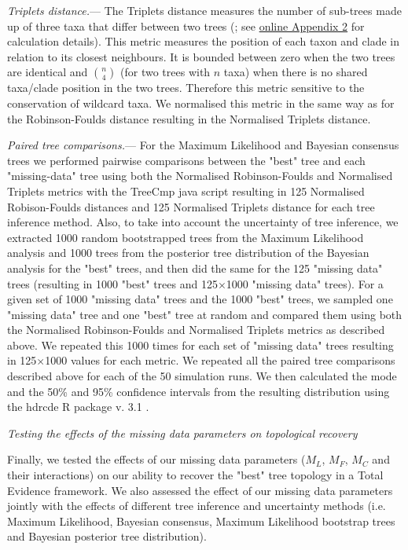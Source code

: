 \documentclass[12pt,letterpaper]{article}
\renewcommand{\subsection}[1]{%
\bigskip
\begin{center}
\begin{large}
\normalfont\itshape #1
\end{large}
\end{center}}
\renewcommand{\subsubsection}[1]{%
\vspace{2ex}
\noindent
\textit{#1.}---}
\begin{document}
\subsubsection{Triplets distance}
The Triplets distance \citep{dobson1975triplets} measures the number of sub-trees made up of three taxa that differ between two trees (\citealt{critchlowthe1996}; see \hyperref[SupplementaryMaterial]{online Appendix 2} for calculation details). This metric measures the position of each taxon and clade in relation to its closest neighbours. It is bounded between zero when the two trees are identical and $\binom{n}{4}$ (for two trees with $n$ taxa) when there is no shared taxa/clade position in the two trees. Therefore this metric sensitive to the conservation of wildcard taxa. We normalised this metric in the same way as for the Robinson-Foulds distance resulting in the Normalised Triplets distance.

\subsubsection{Paired tree comparisons}
\label{tree_comparisons}
For the Maximum Likelihood and Bayesian consensus trees we performed pairwise comparisons between the "best" tree and each "missing-data" tree using both the Normalised Robinson-Foulds and Normalised Triplets metrics with the TreeCmp java script \citep{Bogdanowicz2012} resulting in 125 Normalised Robison-Foulds distances and 125 Normalised Triplets distance for each tree inference method. Also, to take into account the uncertainty of tree inference, we extracted 1000 random bootstrapped trees from the Maximum Likelihood analysis and 1000 trees from the posterior tree distribution of the Bayesian analysis for the "best" trees, and then did the same for the 125 "missing data" trees (resulting in 1000 "best" trees and 125$\times$1000 "missing data" trees). 
For a given set of 1000 "missing data" trees and the 1000 "best" trees, we sampled one "missing data" tree and one "best" tree at random and compared them using both the Normalised Robinson-Foulds and Normalised Triplets metrics as described above. We repeated this 1000 times for each set of "missing data" trees resulting in 125$\times$1000 values for each metric. We repeated all the paired tree comparisons described above for each of the 50 simulation runs. We then calculated the mode and the 50\% and 95\% confidence intervals from the resulting distribution using the hdrcde R package v. 3.1 \citep{hdrcde}.

\subsection{Testing the effects of the missing data parameters on topological recovery}
Finally, we tested the effects of our missing data parameters ($M_{L}$, $M_{F}$, $M_{C}$ and their interactions) on our ability to recover the "best" tree topology in a Total Evidence framework. We also assessed the effect of our missing data parameters jointly with the effects of different tree inference and uncertainty methods (i.e. Maximum Likelihood, Bayesian consensus, Maximum Likelihood bootstrap trees and Bayesian posterior tree distribution).
\end{document}
